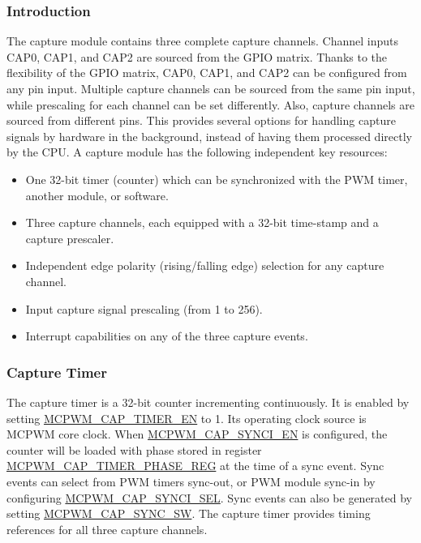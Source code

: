 \documentclass[main\_\_EN.tex]{subfiles}
\begin{document}
\subsubsection{Introduction}
The capture module contains three complete capture channels. Channel inputs CAP0, CAP1, and CAP2 are sourced from the GPIO matrix. Thanks to the flexibility of the GPIO matrix, CAP0, CAP1, and CAP2 can be configured from any pin input. Multiple capture channels can be sourced from the same pin input, while prescaling for each channel can be set differently. Also, capture channels are sourced from different pins. This provides several options for handling capture signals by hardware in the background, instead of having them processed directly by the CPU. 
A capture module has the following independent key resources:
\begin{itemize}
    \item One 32-bit timer (counter) which can be synchronized with the PWM timer, another module, or software.
    \item Three capture channels, each equipped with a 32-bit time-stamp and a capture prescaler.
    \item Independent edge polarity (rising/falling edge) selection for any capture channel.
    \item Input capture signal prescaling (from 1 to 256).
    \item Interrupt capabilities on any of the three capture events.
\end{itemize}

\subsubsection{Capture Timer}
The capture timer is a 32-bit counter incrementing continuously. It is enabled by setting \hyperref[fielddesc:MCPWMCAPTIMEREN]{MCPWM\_CAP\_TIMER\_EN} to 1. Its operating clock source is MCPWM core clock. When \hyperref[fielddesc:MCPWMCAPSYNCIEN]{MCPWM\_CAP\_SYNCI\_EN} is configured, the counter will be loaded with phase stored in register\\\hyperref[regdesc:MCPWMCAPTIMERPHASEREG]{MCPWM\_CAP\_TIMER\_PHASE\_REG} at the time of a sync event. Sync events can select from PWM timers sync-out, or PWM module sync-in by configuring \hyperref[fielddesc:MCPWMCAPSYNCISEL]{MCPWM\_CAP\_SYNCI\_SEL}. Sync events can also be generated by setting \hyperref[fielddesc:MCPWMCAPSYNCSW]{MCPWM\_CAP\_SYNC\_SW}. The capture timer provides timing references for all three capture channels.
\end{document}
